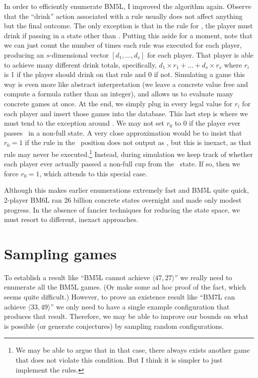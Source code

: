 \documentclass[twocolumn]{article}
\begin{document}
In order to efficiently enumerate BM5L, I improved the algorithm
again. Observe that the ``drink'' action associated with a rule
usually does not affect anything but the final outcome. The only
exception is that in the rule for \fullcup, the player must drink if
passing in a state other than \fullcup. Putting this aside for a
moment, note that we can just count the number of times each rule was
executed for each player, producing an $s$-dimensional vector $[ d_1,
  \ldots, d_s ]$ for each player. That player is able to achieve many
different drink totals, specifically, $d_1 \times r_1 + \ldots + d_s
\times r_s$ where $r_i$ is 1 if the player should drink on that rule
and 0 if not. Simulating a game this way is even more like abstract
interpretation (we leave a concrete value free and compute a formula
rather than an integer), and allows us to evaluate many concrete games
at once. At the end, we simply plug in every legal value for $r_i$ for
each player and insert those games into the database. This last step
is where we must tend to the exception around \fullcup. We may not set
$r_0$ to 0 if the player ever passes \fullcup\ in a non-full state. A
very close approximation would be to insist that $r_0 = 1$ if the rule
in the \fullcup\ position does not output as \fullcup, but this is
inexact, as that rule may never be executed.\!\footnote{We may be able to
  argue that in that case, there always exists another game that does
  not violate this condition. But I think it is simpler to just
  implement the rules.} Instead, during simulation we keep track of
whether each player ever actually passed a non-full cup from the
\fullcup\ state. If so, then we force $r_0 = 1$, which attends to this
special case. \label{sec:linear}

Although this makes earlier enumerations extremely fast and BM5L
quite quick, 2-player BM6L ran 26 billion concrete states overnight
and made only modest progress. In the absence of fancier techniques
for reducing the state space, we must resort to different, inexact
approaches.

\section{Sampling games}

To establish a result like ``BM5L cannot achieve $\langle 47, 27
\rangle$'' we really need to enumerate all the BM5L games. (Or make
some ad hoc proof of the fact, which seems quite difficult.) However,
to prove an existence result like ``BM7L can achieve $\langle 33, 49
\rangle$'' we only need to have a single example configuration that
produces that result. Therefore, we may be able to improve our bounds
on what is possible (or generate conjectures) by sampling random
configurations.
\end{document}
